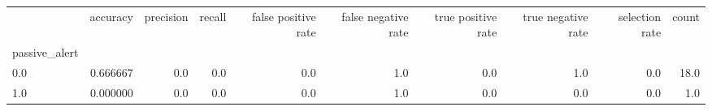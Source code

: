 \begin{tabular}{lrrrrrrrrr}
\toprule
{} &  accuracy &  precision &  recall &  false positive rate &  false negative rate &  true positive rate &  true negative rate &  selection rate &  count \\
passive\_alert &           &            &         &                      &                      &                     &                     &                 &        \\
\midrule
0.0           &  0.666667 &        0.0 &     0.0 &                  0.0 &                  1.0 &                 0.0 &                 1.0 &             0.0 &   18.0 \\
1.0           &  0.000000 &        0.0 &     0.0 &                  0.0 &                  1.0 &                 0.0 &                 0.0 &             0.0 &    1.0 \\
\bottomrule
\end{tabular}
